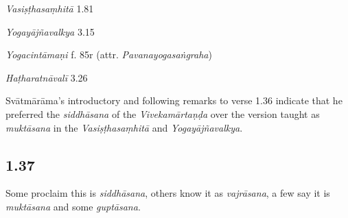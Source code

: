 \begin{ekdosis}
\begin{sources}[hp01_036]
\emph{Vasiṣṭhasaṃhitā} 1.81

\begin{versinnote}
\end{versinnote}

\emph{Yogayājñavalkya} 3.15

\begin{versinnote}
\end{versinnote}

\end{sources}

\begin{testimonia}[hp01_036]
\emph{Yogacintāmaṇi} f. 85r (attr. \emph{Pavanayogasaṅgraha})

\begin{versinnote}
\end{versinnote}

\emph{Haṭharatnāvalī} 3.26

\begin{versinnote}
\end{versinnote}

\end{testimonia}

\begin{philcomm}[hp01_036]
Svātmārāma's introductory and following remarks to verse 1.36 indicate that he preferred the \emph{siddhāsana} of the \emph{Vivekamārtaṇḍa} over the version taught as \emph{muktāsana} in the \emph{Vasiṣṭhasaṃhitā} and \emph{Yogayājñavalkya}.
\end{philcomm}
\subsection*{1.37}
\begin{translation}[hp01_037]
Some proclaim this is \emph{siddhāsana}, others know it as \emph{vajrāsana}, a few say it is \emph{muktāsana} and some \emph{guptāsana}.
\end{translation}


\end{ekdosis}
